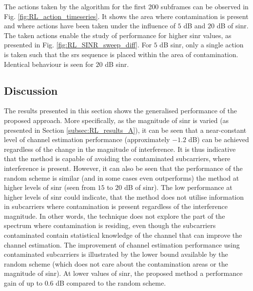 The actions taken by the algorithm for the first 200 subframes can be observed in Fig. \ref{fig:RL_action_timeseries}. It shows the area where contamination is present and where actions have been taken under the influence of $5$ dB and $20$ dB of \gls{sinr}. The taken actions enable the study of performance for higher \gls{sinr} values, as presented in Fig. \ref{fig:RL_SINR_sweep_diff}. For $5$ dB \gls{sinr}, only a single action is taken such that the \gls{srs} sequence is placed within the area of contamination. Identical behaviour is seen for $20$ dB \gls{sinr}.





\subsection{Discussion}\label{sec:RL_discussion}
The results presented in this section shows the generalised performance of the proposed approach. More specifically, as the magnitude of \gls{sinr} is varied (as presented in Section \ref{subsec:RL_results_A}), it can be seen that a near-constant level of channel estimation performance (approximately $-1.2$ dB) can be achieved regardless of the change in the magnitude of interference. It is thus indicative that the method is capable of avoiding the contaminated subcarriers, where interference is present. However, it can also be seen that the performance of the random scheme is similar (and in some cases even outperforms) the method at higher levels of \gls{sinr} (seen from $15$ to $20$ dB of \gls{sinr}). The low performance at higher levels of \gls{sinr} could indicate, that the method does not utilise information in subcarriers where contamination is present regardless of the interference magnitude. In other words, the technique does not explore the part of the spectrum where contamination is residing, even though the subcarriers contaminated contain statistical knowledge of the channel that can improve the channel estimation. The improvement of channel estimation performance using contaminated subcarriers is illustrated by the lower bound available by the random scheme (which does not care about the contamination areas or the magnitude of \gls{sinr}). At lower values of \gls{sinr}, the proposed method a performance gain of up to $0.6$ dB compared to the random scheme. 

